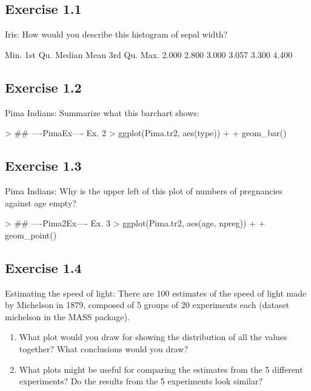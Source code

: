 \documentclass[12pt,letterpaper,final]{article}
\begin{document}
\subsection{Exercise 1.1}


Iris: How would you describe this histogram of sepal width?

\begin{Schunk}
\begin{Soutput}
   Min. 1st Qu.  Median    Mean 3rd Qu.    Max. 
  2.000   2.800   3.000   3.057   3.300   4.400 
\end{Soutput}
\end{Schunk}


\subsection{Exercise 1.2}

Pima Indians: Summarize what this barchart shows:

\begin{Schunk}
\begin{Sinput}
> ## ----PimaEx---- Ex. 2
> ggplot(Pima.tr2, aes(type)) + 
+   geom_bar()
\end{Sinput}
\end{Schunk}


\subsection{Exercise 1.3}

Pima Indians: Why is the upper left of this plot of numbers of pregnancies against
age empty?

\begin{Schunk}
\begin{Sinput}
> ## ----Pima2Ex---- Ex. 3
> ggplot(Pima.tr2, aes(age, npreg)) + 
+   geom_point()
\end{Sinput}
\end{Schunk}


\subsection{Exercise 1.4}

Estimating the speed of light: There are 100 estimates of the speed of light made by
Michelson in 1879, composed of 5 groups of 20 experiments each (dataset michelson in the
MASS package).
\begin{enumerate}
\item What plot would you draw for showing the distribution of all the values together?
What conclusions would you draw?
\item What plots might be useful for comparing the estimates from the 5 different experiments?
Do the results from the 5 experiments look similar?
\end{enumerate}
\end{document}
